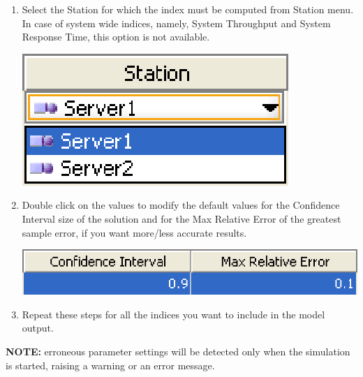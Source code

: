 \begin{enumerate}
\begin{center}
\end{center}
\item Select the Station for which the index must be computed from Station menu. In case of system wide indices, namely, System Throughput and System Response Time, this option is not available.
\begin{center}
\includegraphics[scale=.5]{img/jsim/station.eps}
\end{center}
\item Double click on the values to modify the default values for the Confidence Interval size of the solution and for the Max Relative Error of the greatest sample error, if you want more/less accurate results.
\begin{center}
\includegraphics[scale=.5]{img/jsim/err_conf.eps}
\end{center}
\item Repeat these steps for all the indices you want to include in the model output.
\end{enumerate}
\textbf{NOTE:} erroneous parameter settings will be detected only when the simulation is started, raising a warning or an error message.

